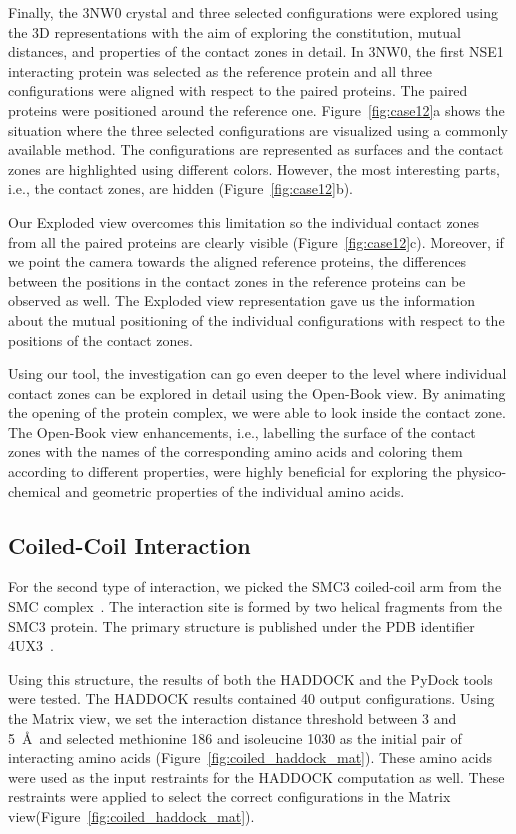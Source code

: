 \documentclass{bmcart}
\def\OpBook {Open-Book view\xspace}
\def\ExpView {Exploded view\xspace}
\def\MatView {Matrix view\xspace}
\begin{document}
Finally, the 3NW0 crystal and three selected configurations were explored using the 3D representations with the aim of exploring the constitution, mutual distances, and properties of the contact zones in detail.
In 3NW0, the first NSE1 interacting protein was selected as the reference protein and all three configurations were aligned with respect to the paired proteins.
The paired proteins were positioned around the reference one.
Figure~\ref{fig:case12}a shows the situation where the three selected configurations are visualized using a commonly available method.
The configurations are represented as surfaces and the contact zones are highlighted using different colors.
However, the most interesting parts, i.e., the contact zones, are hidden (Figure~\ref{fig:case12}b).

Our \ExpView overcomes this limitation so the individual contact zones from all the paired proteins are clearly visible (Figure~\ref{fig:case12}c).
Moreover, if we point the camera towards the aligned reference proteins, the differences between the positions in the contact zones in the reference proteins can be observed as well.
The \ExpView representation gave us the information about the mutual positioning of the individual configurations with respect to the positions of the contact zones.

Using our tool, the investigation can go even deeper to the level where individual contact zones can be explored in detail using the \OpBook.
By animating the opening of the protein complex, we were able to look inside the contact zone.
The \OpBook enhancements, i.e., labelling the surface of the contact zones with the names of the corresponding amino acids and coloring them according to different properties, were highly beneficial for exploring the physico-chemical and geometric properties of the individual amino acids.


\subsection*{Coiled-Coil Interaction}
For the second type of interaction, we picked the SMC3 coiled-coil arm from the SMC complex~\cite{Gligoris}.
The interaction site is formed by two helical fragments from the SMC3 protein.
The primary structure is published under the PDB identifier 4UX3~\cite{pmid25414305}.  

Using this structure, the results of both the HADDOCK and the PyDock tools were tested.
The HADDOCK results contained 40 output configurations.
Using the \MatView, we set the interaction distance threshold between 3 and 5~\AA~and selected methionine 186 and isoleucine 1030 as the initial pair of interacting amino acids (Figure~\ref{fig:coiled_haddock_mat}). 
These amino acids were used as the input restraints for the HADDOCK computation as well.
These restraints were applied to select the correct configurations in the \MatView (Figure~\ref{fig:coiled_haddock_mat}).
\end{document}
